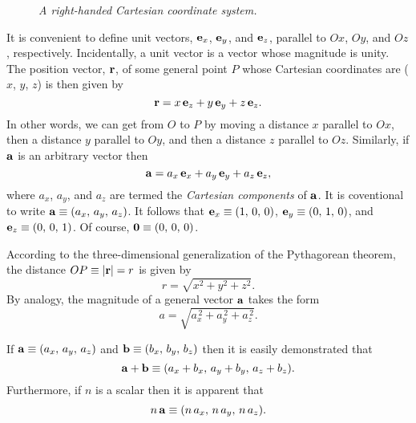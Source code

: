 \begin{figure}
\epsfysize=1.75in
\centerline{}
\caption{\em A right-handed Cartesian coordinate system.}\label{fig2b}
\end{figure}

It is convenient to define unit vectors, ${\bf e}_x$, ${\bf e}_y$, and ${\bf e}_z$,  parallel to $Ox$, $Oy$, and $Oz$, respectively.
Incidentally, a unit vector is a vector whose magnitude is unity. The position vector, ${\bf r}$,  of some general point $P$ whose Cartesian coordinates
are ($x$, $y$, $z$) is then given by
\begin{equation}
{\bf r} = x\,{\bf e}_z + y\,{\bf e}_y+z\,{\bf e}_z.
\end{equation}
In other words, we can get from $O$ to $P$ by moving a distance $x$ parallel to $Ox$, then a distance
$y$ parallel to $Oy$, and then a distance $z$ parallel to $Oz$. Similarly, if ${\bf a}$ is an arbitrary vector then 
\begin{equation}
{\bf a} = a_x\,{\bf e}_x+ a_y\,{\bf e}_y+a_z\,{\bf e}_z,
\end{equation}
where $a_x$, $a_y$, and $a_z$ are termed the {\em Cartesian components}\/ of ${\bf a}$. It is coventional to write ${\bf a} \equiv (a_x,\,a_y,\,a_z)$. 
It follows that ${\bf e}_x\equiv (1,\,0,\,0)$, ${\bf e}_y\equiv (0,\,1,\,0)$, and ${\bf e}_z\equiv
(0,\,0,\,1)$. Of course, ${\bf 0} \equiv (0,\,0,\,0)$. 

According to the three-dimensional generalization of the Pythagorean theorem, the distance $OP\equiv |{\bf r}|=r$ is
given by
\begin{equation}
r = \sqrt{x^2 + y^2 + z^2}.
\end{equation}
By analogy, the magnitude of a general vector ${\bf a}$ takes the form
\begin{equation}
a = \sqrt{a_x^{\,2} + a_y^{\,2} + a_z^{\,2}}.
\end{equation}

If ${\bf a}\equiv (a_x,\,a_y,\,a_z)$ and ${\bf b}\equiv (b_x,\,b_y,\,b_z)$ then it is
easily demonstrated that
\begin{equation}
{\bf a} + {\bf b} \equiv (a_x+b_x,\,a_y+b_y,\,a_z+b_z).
\end{equation}
Furthermore, if $n$ is a scalar then it is apparent that
\begin{equation}
n\,{\bf a} \equiv (n\,a_x,\,n\,a_y,\,n\,a_z).
\end{equation}

